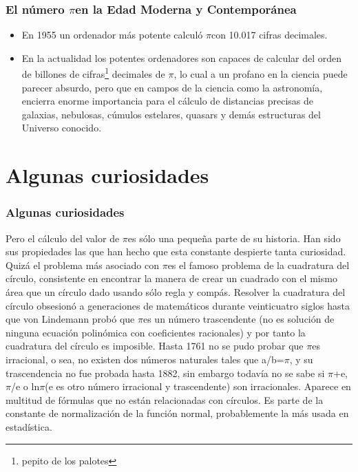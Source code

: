 \documentclass{beamer}
\newcommand{\PI}{{$\pi$}}
\begin{document}
\begin{frame}
\frametitle{El número \PI en la Edad Moderna y Contemporánea}

\begin{itemize}
\item En 1955 un ordenador más potente calculó \PI con 10.017 cifras decimales.

\item En la actualidad los potentes ordenadores son capaces de calcular del orden de billones de cifras\footnote{pepito de los palotes} decimales de \PI, lo cual a un profano en la ciencia puede parecer absurdo, pero que en campos de la ciencia como la astronomía, encierra enorme importancia para el cálculo de distancias precisas de galaxias, nebulosas, cúmulos estelares, quasars y demás estructuras del Universo conocido.
\end{itemize}
\end{frame}

\section{Algunas curiosidades}
\begin{frame}
\frametitle{Algunas curiosidades}

Pero el cálculo del valor de \PI es sólo una pequeña parte de su historia. Han sido sus propiedades las que han hecho que esta constante despierte tanta curiosidad.
Quizá el problema más asociado con \PI es el famoso problema de la cuadratura del círculo, consistente en encontrar la manera de crear un cuadrado con el mismo área que un círculo dado usando sólo regla y compás. Resolver la cuadratura del círculo obsesionó a generaciones de matemáticos durante veinticuatro siglos hasta que von Lindemann probó que \PI es un número trascendente (no es solución de ninguna ecuación polinómica con coeficientes racionales) y por tanto la cuadratura del círculo es imposible.
Hasta 1761 no se pudo probar que \PI es irracional, o sea, no existen dos números naturales tales que a/b=\PI, y su trascendencia no fue probada hasta 1882, sin embargo todavía no se sabe si \PI +e, \PI/e o ln\PI (e es otro número irracional y trascendente) son irracionales. Aparece en multitud de fórmulas que no están relacionadas con círculos. Es parte de la constante de normalización de la función normal, probablemente la más usada en estadística. 
\end{frame}
\end{document}
